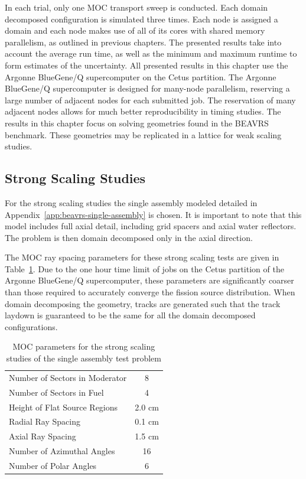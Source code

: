 In each trial, only one \ac{MOC} transport sweep is conducted. Each domain decomposed configuration is simulated three times. Each node is assigned a domain and each node makes use of all of its cores with shared memory parallelism, as outlined in previous chapters. The presented results take into account the average run time, as well as the minimum and maximum runtime to form estimates of the uncertainty. All presented results in this chapter use the Argonne BlueGene/Q supercomputer on the Cetus partition. The Argonne BlueGene/Q supercomputer is designed for many-node parallelism, reserving a large number of adjacent nodes for each submitted job. The reservation of many adjacent nodes allows for much better reproducibility in timing studies. The results in this chapter focus on solving geometries found in the BEAVRS benchmark. These geometries may be replicated in a lattice for weak scaling studies. 

\subsection{Strong Scaling Studies}
\label{sec:dd-strong-scaling}

For the strong scaling studies the single assembly modeled detailed in Appendix~\ref{app:beavrs-single-assembly} is chosen. It is important to note that this model includes full axial detail, including grid spacers and axial water reflectors. The problem is then domain decomposed only in the axial direction. 

The \ac{MOC} ray spacing parameters for these strong scaling tests are given in Table~\ref{tab:dd-ss-params}. Due to the one hour time limit of jobs on the Cetus partition of the Argonne BlueGene/Q supercomputer, these parameters are significantly coarser than those required to accurately converge the fission source distribution. When domain decomposing the geometry, tracks are generated such that the track laydown is guaranteed to be the same for all the domain decomposed configurations.

\begin{table}[ht]
	\centering
	\caption{MOC parameters for the strong scaling studies of the single assembly test problem}
	\medskip
	\begin{tabular}{lc}
		\hline
		Number of Sectors in Moderator & 8 \\
		Number of Sectors in Fuel & 4 \\
		Height of Flat Source Regions & 2.0 cm \\
		Radial Ray Spacing & 0.1 cm \\
		Axial Ray Spacing & 1.5 cm \\
		Number of Azimuthal Angles & 16 \\
		Number of Polar Angles & 6 \\
		\hline
	\end{tabular}
	\label{tab:dd-ss-params}
\end{table}


